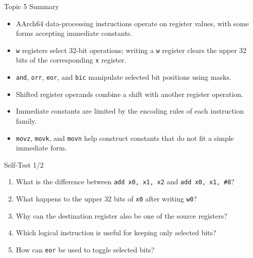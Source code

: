 \documentclass[aspectratio=169,11pt,t]{beamer}
\newcommand{\code}[1]{\texttt{#1}}
\begin{document}
\begin{frame}{Topic 5 Summary}
\begin{itemize}
\item AArch64 data-processing instructions operate on register values, with some forms accepting immediate constants.
\item \code{w} registers select 32-bit operations; writing a \code{w} register clears the upper 32 bits of the corresponding \code{x} register.
\item \code{and}, \code{orr}, \code{eor}, and \code{bic} manipulate selected bit positions using masks.
\item Shifted register operands combine a shift with another register operation.
\item Immediate constants are limited by the encoding rules of each instruction family.
\item \code{movz}, \code{movk}, and \code{movn} help construct constants that do not fit a simple immediate form.
\end{itemize}
\end{frame}





\begin{frame}{Self-Test 1/2}
\begin{enumerate}
\item What is the difference between \code{add x0, x1, x2} and \code{add x0, x1, \#8}?
\item What happens to the upper 32 bits of \code{x0} after writing \code{w0}?
\item Why can the destination register also be one of the source registers?
\item Which logical instruction is useful for keeping only selected bits?
\item How can \code{eor} be used to toggle selected bits?
\end{enumerate}
\end{frame}

\end{document}
